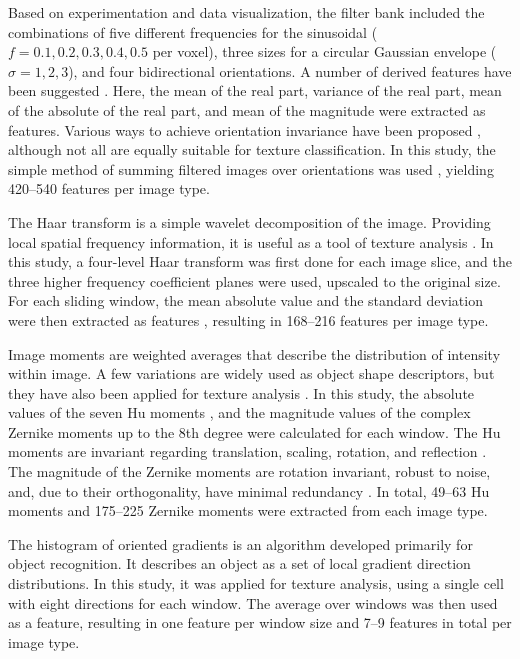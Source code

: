 Based on experimentation and data visualization, the filter bank included the
combinations of five different frequencies for the sinusoidal
($f=0.1,0.2,0.3,0.4,0.5$ per voxel), three sizes for a circular Gaussian
envelope ($\sigma=1,2,3$), and four bidirectional orientations. A number of
derived features have been suggested \citep{Clausi2000, Hammouda2000,
Grigorescu2002}. Here, the mean of the real part, variance of the real part,
mean of the absolute of the real part, and mean of the magnitude were extracted
as features. Various ways to achieve orientation invariance have been proposed
\citep{Arivazhagan2006, Han2007, Chu2009, Rahman2011}, although not all are
equally suitable for texture classification. In this study, the simple method of
summing filtered images over orientations was used \citep{Han2007}, yielding
420--540 features per image type.

The Haar transform is a simple wavelet decomposition of the image. Providing
local spatial frequency information, it is useful as a tool of texture analysis
\citep{Lonnestad1992}. In this study, a four-level Haar transform was first done
for each image slice, and the three higher frequency coefficient planes were
used, upscaled to the original size. For each sliding window, the mean absolute
value and the standard deviation were then extracted as features
\citep{Lonnestad1992}, resulting in 168--216 features per image type.

Image moments are weighted averages that describe the distribution of intensity
within image. A few variations are widely used as object shape descriptors, but
they have also been applied for texture analysis \citep{Tuceryan1994}. In this
study, the absolute values of the seven Hu moments \citep{Hu1962}, and the
magnitude values of the complex Zernike moments \citep{Teague1980} up to the 8th
degree were calculated for each window. The Hu moments are invariant regarding
translation, scaling, rotation, and reflection \citep{Theodoridis2003}. The
magnitude of the Zernike moments are rotation invariant, robust to noise, and,
due to their orthogonality, have minimal redundancy \citep{Tahmasbi2011,
Amayeh2005}. In total, 49--63 Hu moments and 175--225 Zernike moments were
extracted from each image type.

The histogram of oriented gradients \citep{Dalal2005} is an algorithm developed
primarily for object recognition. It describes an object as a set of local
gradient direction distributions. In this study, it was applied for texture
analysis, using a single cell with eight directions for each window. The average
over windows was then used as a feature, resulting in one feature per window
size and 7--9 features in total per image type.


